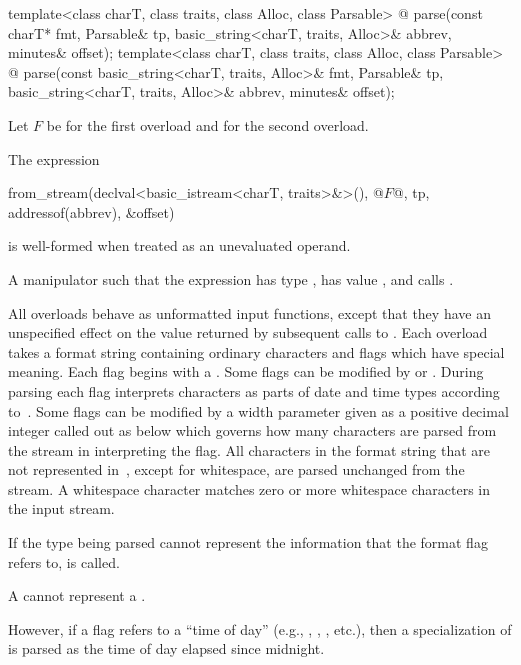\begin{itemdecl}
template<class charT, class traits, class Alloc, class Parsable>
  @\unspec@
    parse(const charT* fmt, Parsable& tp,
          basic_string<charT, traits, Alloc>& abbrev, minutes& offset);
template<class charT, class traits, class Alloc, class Parsable>
  @\unspec@
    parse(const basic_string<charT, traits, Alloc>& fmt, Parsable& tp,
          basic_string<charT, traits, Alloc>& abbrev, minutes& offset);
\end{itemdecl}

\begin{itemdescr}
\pnum
Let $F$ be  for the first overload and
 for the second overload.

\pnum
\constraints
The expression
\begin{codeblock}
from_stream(declval<basic_istream<charT, traits>&>(),
            @$F$@, tp, addressof(abbrev), &offset)
\end{codeblock}
is well-formed when treated as an unevaluated operand.

\pnum
\returns
A manipulator such that
the expression 
has type ,
has value , and
calls .
\end{itemdescr}

\pnum
All  overloads behave as unformatted input functions,
except that they have an unspecified effect
on the value returned by subsequent calls to .
Each overload takes a format string containing ordinary characters
and flags which have special meaning.
Each flag begins with a \tcode{\%}.
Some flags can be modified by  or .
During parsing each flag interprets characters as parts of date and time types
according to~.
Some flags can be modified by a width parameter
given as a positive decimal integer called out as  below
which governs how many characters are parsed from the stream in interpreting the flag.
All characters in the format string that are not represented in~,
except for whitespace, are parsed unchanged from the stream.
A whitespace character matches zero or more whitespace characters in the input stream.

\pnum
If the type being parsed cannot represent
the information that the format flag refers to,
 is called.
\begin{example}
A  cannot represent a .
\end{example}
However, if a flag refers to a ``time of day''
(e.g., , , , etc.),
then a specialization of  is parsed as
the time of day elapsed since midnight.

